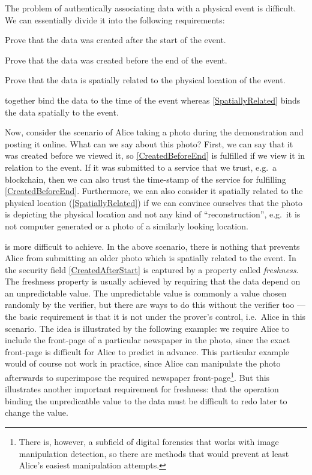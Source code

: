 The problem of authentically associating data with a physical event is 
difficult.
We can essentially divide it into the following requirements:
\begin{requirements}[A]
  \item\label{CreatedAfterStart} Prove that the data was created after the 
    start of the event.
  \item\label{CreatedBeforeEnd} Prove that the data was created before the end 
    of the event.
  \item\label{SpatiallyRelated} Prove that the data is spatially related to the 
    physical location of the event.
\end{requirements} %
 together bind the data to the time of 
the event whereas \cref{SpatiallyRelated} binds the data spatially to the 
event.

Now, consider the scenario of Alice taking a photo during the demonstration and 
posting it online.
What can we say about this photo?
First, we can say that it was created before we viewed it, so 
\cref{CreatedBeforeEnd} is fulfilled if we view it in relation to the event.
If it was submitted to a service that we trust, e.g.\ a blockchain, then we can 
also trust the time-stamp of the service for fulfilling 
\cref{CreatedBeforeEnd}.
Furthermore, we can also consider it spatially related to the physical location
(\cref{SpatiallyRelated}) if we can convince ourselves that the photo is 
depicting the physical location and not any kind of \enquote{reconstruction}, 
e.g.\ it is not computer generated or a photo of a similarly looking location.

 is more difficult to achieve.
In the above scenario, there is nothing that prevents Alice from submitting an 
older photo which is spatially related to the event.
In the security field \cref{CreatedAfterStart} is captured by a property called 
\emph{freshness}.
The freshness property is usually achieved by requiring that the data depend on
an unpredictable value.
The unpredictable value is commonly a value chosen randomly by the verifier, 
but there are ways to do this without the verifier too --- the basic 
requirement is that it is not under the prover's control, i.e.\ Alice in this 
scenario.
The idea is illustrated by the following example: we require Alice to include 
the front-page of a particular newspaper in the photo, since the exact 
front-page is difficult for Alice to predict in advance.
This particular example would of course not work in practice, since Alice can 
manipulate the photo afterwards to superimpose the required newspaper 
front-page\footnote{%
  There is, however, a subfield of digital forensics that works with image 
  manipulation detection, so there are methods that would prevent at least 
  Alice's easiest manipulation attempts.
}.
But this illustrates another important requirement for freshness: that the 
operation binding the unpredicatble value to the data must be difficult to redo 
later to change the value.
